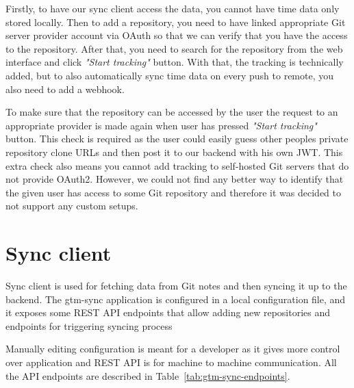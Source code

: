 Firstly, to have our sync client access the data, you cannot have time data only stored locally.
Then to add a repository, you need to have linked appropriate Git server provider account via OAuth so that we can
verify that you have the access to the repository.
After that, you need to search for the repository from the web interface and click \textit{"Start tracking"} button.
With that, the tracking is technically added, but to also automatically sync time data on every push to remote,
you also need to add a webhook.

To make sure that the repository can be accessed by the user the request to an appropriate provider is made again
when user has pressed \textit{"Start tracking"} button.
This check is required as the user could easily guess other peoples private repository clone URLs and then post
it to our backend with his own JWT.
This extra check also means you cannot add tracking to self-hosted Git servers that do not provide OAuth2.
However, we could not find any better way to identify that the given user has access to some Git repository and
therefore it was decided to not support any custom setups.

\section{Sync client}\label{sec:sync-client-content}
Sync client is used for fetching data from Git notes and then syncing it up to the backend.
The gtm-sync application is configured in a local configuration file, and it exposes some REST API endpoints
that allow adding new repositories and endpoints for triggering syncing process

Manually editing configuration is meant for a developer as it gives more control over application and REST API is
for machine to machine communication.
All the API endpoints are described in Table~\ref{tab:gtm-sync-endpoints}.

